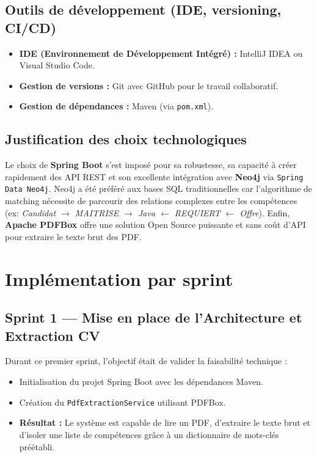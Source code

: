 \documentclass[12pt,a4paper]{report}
\begin{document}
\begin{itemize}
\subsection{Outils de développement (IDE, versioning, CI/CD)}
\begin{itemize}
    \item \textbf{IDE (Environnement de Développement Intégré) :} IntelliJ IDEA ou Visual Studio Code.
    \item \textbf{Gestion de versions :} Git avec GitHub pour le travail collaboratif.
    \item \textbf{Gestion de dépendances :} Maven (via \texttt{pom.xml}).
\end{itemize}

\subsection{Justification des choix technologiques}
Le choix de \textbf{Spring Boot} s'est imposé pour sa robustesse, sa capacité à créer rapidement des API REST et son excellente intégration avec \textbf{Neo4j} via \texttt{Spring Data Neo4j}. Neo4j a été préféré aux bases SQL traditionnelles car l'algorithme de matching nécessite de parcourir des relations complexes entre les compétences (ex: \textit{Candidat $\rightarrow$ MAITRISE $\rightarrow$ Java $\leftarrow$ REQUIERT $\leftarrow$ Offre}). Enfin, \textbf{Apache PDFBox} offre une solution Open Source puissante et sans coût d'API pour extraire le texte brut des PDF.

\section{Implémentation par sprint}

\subsection{Sprint 1 — Mise en place de l'Architecture et Extraction CV}
Durant ce premier sprint, l'objectif était de valider la faisabilité technique :
\begin{itemize}
    \item Initialisation du projet Spring Boot avec les dépendances Maven.
    \item Création du \texttt{PdfExtractionService} utilisant PDFBox.
    \item \textbf{Résultat :} Le système est capable de lire un PDF, d'extraire le texte brut et d'isoler une liste de compétences grâce à un dictionnaire de mots-clés préétabli.
\end{itemize}


\end{itemize}
\end{document}
